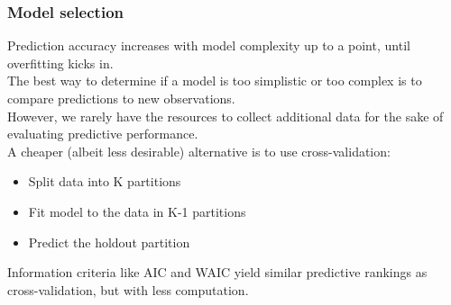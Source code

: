 \documentclass[color=usenames,dvipsnames]{beamer}\usepackage[]{graphicx}\usepackage[]{xcolor}
\begin{document}
\begin{frame}
  \frametitle{Model selection}
  Prediction accuracy increases with model complexity up to a point,
  until overfitting kicks in. \\
  \pause
  \vfill
  The best way to determine if a model is too simplistic or too
  complex is to compare predictions to new observations. \\
  \pause
  \vfill
  However, we rarely have the resources to
  collect additional data for the sake of evaluating predictive
  performance. \\ 
  \pause
  \vfill
  A cheaper (albeit less desirable) alternative is to use
  cross-validation: 
  \begin{itemize}
    \item Split data into K partitions
    \item Fit model to the data in K-1 partitions
    \item Predict the holdout partition
  \end{itemize}
  \pause
  \vfill
  Information criteria like AIC and WAIC yield similar predictive
  rankings as cross-validation, but with less computation.    
\end{frame}
\end{document}
